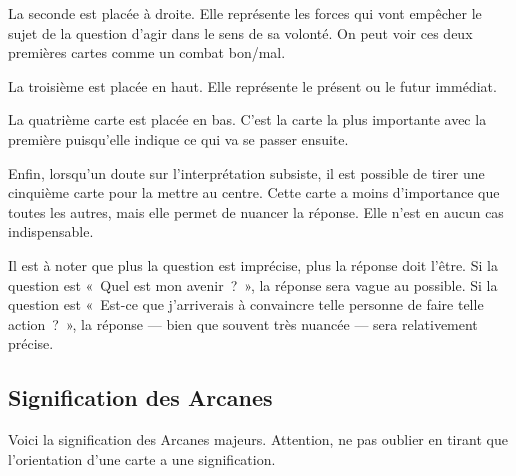 {{La seconde est placée à droite.
Elle représente les forces qui vont empêcher le sujet de la question d’agir dans le sens de sa volonté.
On peut voir ces deux premières cartes comme un combat bon/mal.

La troisième est placée en haut.
Elle représente le présent ou le futur immédiat.

La quatrième carte est placée en bas.
C’est la carte la plus importante avec la première puisqu’elle indique ce qui va se passer ensuite.

Enfin, lorsqu’un doute sur l’interprétation subsiste, il est possible de tirer une cinquième carte pour la mettre au centre.
Cette carte a moins d’importance que toutes les autres, mais elle permet de nuancer la réponse.
Elle n’est en aucun cas indispensable.

Il est à noter que plus la question est imprécise, plus la réponse doit l’être.
Si la question est «~Quel est mon avenir~?~», la réponse sera vague au possible.
Si la question est «~Est-ce que j’arriverais à convaincre telle personne de faire telle action~?~», la réponse — bien que souvent très nuancée — sera relativement précise.

\subsection{Signification des Arcanes}

Voici la signification des Arcanes majeurs.
Attention, ne pas oublier en tirant que l’orientation d’une carte a une signification.
}

}
